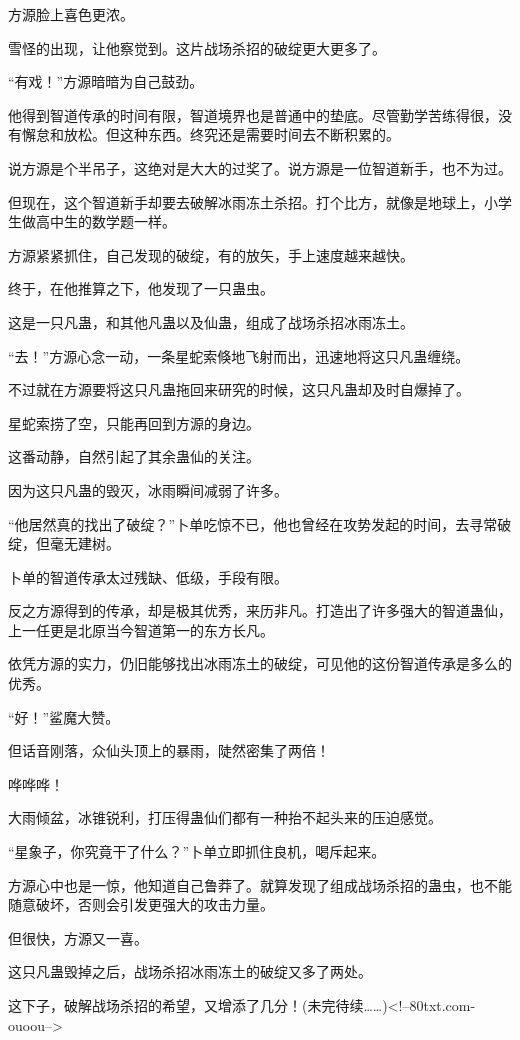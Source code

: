 \begin{this_body}
方源脸上喜色更浓。

雪怪的出现，让他察觉到。这片战场杀招的破绽更大更多了。

“有戏！”方源暗暗为自己鼓劲。

他得到智道传承的时间有限，智道境界也是普通中的垫底。尽管勤学苦练得很，没有懈怠和放松。但这种东西。终究还是需要时间去不断积累的。

说方源是个半吊子，这绝对是大大的过奖了。说方源是一位智道新手，也不为过。

但现在，这个智道新手却要去破解冰雨冻土杀招。打个比方，就像是地球上，小学生做高中生的数学题一样。

方源紧紧抓住，自己发现的破绽，有的放矢，手上速度越来越快。

终于，在他推算之下，他发现了一只蛊虫。

这是一只凡蛊，和其他凡蛊以及仙蛊，组成了战场杀招冰雨冻土。

“去！”方源心念一动，一条星蛇索倏地飞射而出，迅速地将这只凡蛊缠绕。

不过就在方源要将这只凡蛊拖回来研究的时候，这只凡蛊却及时自爆掉了。

星蛇索捞了空，只能再回到方源的身边。

这番动静，自然引起了其余蛊仙的关注。

因为这只凡蛊的毁灭，冰雨瞬间减弱了许多。

“他居然真的找出了破绽？”卜单吃惊不已，他也曾经在攻势发起的时间，去寻常破绽，但毫无建树。

卜单的智道传承太过残缺、低级，手段有限。

反之方源得到的传承，却是极其优秀，来历非凡。打造出了许多强大的智道蛊仙，上一任更是北原当今智道第一的东方长凡。

依凭方源的实力，仍旧能够找出冰雨冻土的破绽，可见他的这份智道传承是多么的优秀。

“好！”鲨魔大赞。

但话音刚落，众仙头顶上的暴雨，陡然密集了两倍！

哗哗哗！

大雨倾盆，冰锥锐利，打压得蛊仙们都有一种抬不起头来的压迫感觉。

“星象子，你究竟干了什么？”卜单立即抓住良机，喝斥起来。

方源心中也是一惊，他知道自己鲁莽了。就算发现了组成战场杀招的蛊虫，也不能随意破坏，否则会引发更强大的攻击力量。

但很快，方源又一喜。

这只凡蛊毁掉之后，战场杀招冰雨冻土的破绽又多了两处。

这下子，破解战场杀招的希望，又增添了几分！(未完待续……)<!--80txt.com-ouoou-->

\end{this_body}

